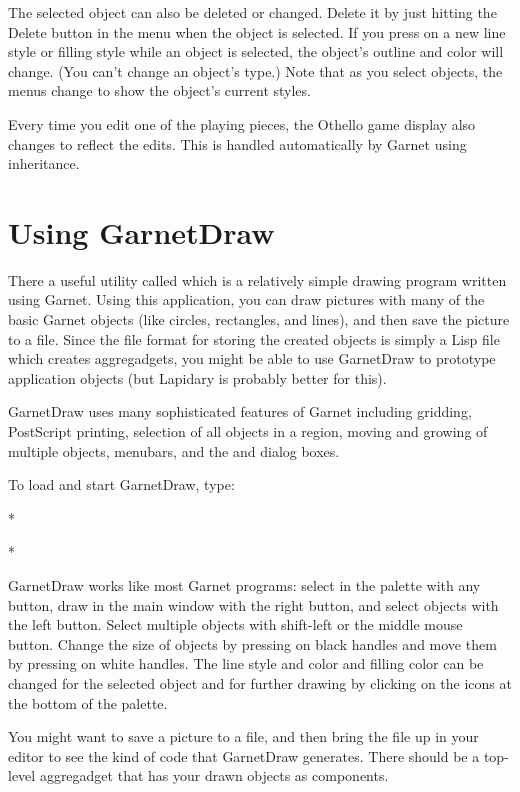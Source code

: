 The selected object can also be deleted or changed.  Delete it by just
hitting the Delete button in the menu when the object is selected.  If you
press on a new line style or
filling style while an object is selected, the object's outline and color will
change.  (You can't change an object's type.)  Note that as you select
objects, the menus change to show the object's current styles.

Every time you edit one of the playing pieces, the Othello game display
also changes to reflect the edits.  This is handled automatically by Garnet
using inheritance.


\chapter{Using GarnetDraw}

There a useful utility called  which is a
relatively simple drawing program written using Garnet.  Using this
application, you can draw pictures with many of the basic Garnet objects
(like circles, rectangles, and lines), and then save the picture to a file.
Since the file format for storing the created objects is simply a Lisp file
which creates aggregadgets, you might be able to use GarnetDraw to prototype
application objects (but Lapidary is probably better for this).

GarnetDraw uses many sophisticated features of Garnet including gridding,
PostScript printing, selection of all objects in a region, moving and growing
of multiple objects, menubars, and the  and 
dialog boxes.

To load and start GarnetDraw, type:
\begin{programexample}
* 

* 
\end{programexample}

GarnetDraw works like most Garnet programs: select in the palette
with any button, draw in the main window with the right button, and select
objects with the left button.  Select multiple objects with shift-left or
the middle mouse button.  Change the size of objects by pressing on black
handles and move them by pressing on
white handles.  The line style and color and filling color can be
changed for the selected object and for further drawing by clicking on
the icons at the bottom of the palette.

You might want to save a picture to a file, and then bring the file up in
your editor to see the kind of code that GarnetDraw generates.  There should
be a top-level aggregadget that has your drawn objects as components.

